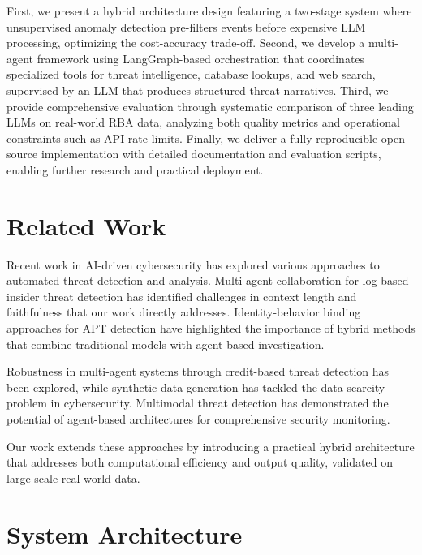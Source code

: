 \documentclass[11pt,twocolumn]{article}
\begin{document}
First, we present a hybrid architecture design featuring a two-stage system where unsupervised anomaly detection pre-filters events before expensive LLM processing, optimizing the cost-accuracy trade-off. Second, we develop a multi-agent framework using LangGraph-based orchestration that coordinates specialized tools for threat intelligence, database lookups, and web search, supervised by an LLM that produces structured threat narratives. Third, we provide comprehensive evaluation through systematic comparison of three leading LLMs on real-world RBA data, analyzing both quality metrics and operational constraints such as API rate limits. Finally, we deliver a fully reproducible open-source implementation with detailed documentation and evaluation scripts, enabling further research and practical deployment.

\section{Related Work}

Recent work in AI-driven cybersecurity has explored various approaches to automated threat detection and analysis. Multi-agent collaboration for log-based insider threat detection has identified challenges in context length and faithfulness that our work directly addresses. Identity-behavior binding approaches for APT detection have highlighted the importance of hybrid methods that combine traditional models with agent-based investigation.

Robustness in multi-agent systems through credit-based threat detection has been explored, while synthetic data generation has tackled the data scarcity problem in cybersecurity. Multimodal threat detection has demonstrated the potential of agent-based architectures for comprehensive security monitoring.

Our work extends these approaches by introducing a practical hybrid architecture that addresses both computational efficiency and output quality, validated on large-scale real-world data.

\section{System Architecture}
\end{document}
